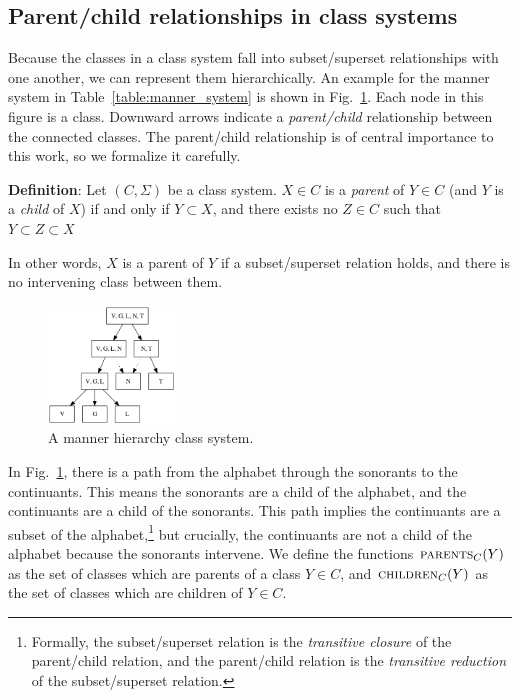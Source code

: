 \documentclass[12pt, oneside]{article}   	%
\begin{document}
\subsection{Parent/child relationships in class systems}

Because the classes in a class system fall into subset/superset relationships with one another, we can represent them hierarchically. An example for the manner system in Table~\ref{table:manner_system} is shown in Fig.~\ref{fig:manner_input}. Each node in this figure is a class. Downward arrows indicate a \textit{parent/child} relationship between the connected classes. The parent/child relationship is of central importance to this work, so we formalize it carefully.

\vspace{0.5\baselineskip} \noindent \textbf{Definition}: Let $(C, \Sigma)$ be a class system. $X \in C$ is a \textit{parent} of $Y \in C$ (and $Y$ is a \textit{child} of $X$) if and only if $Y \subset X$, and there exists no $Z \in C$ such that $Y \subset Z \subset X$

\vspace{0.5\baselineskip} \noindent In other words, $X$ is a parent of $Y$ if a subset/superset relation holds, and there is no intervening class between them.

\begin{figure}[htb!]
	\centering
	\includegraphics[width=0.3\textwidth]{manner_poset_privative.png}
	\caption{A manner hierarchy class system.}
	\label{fig:manner_input}
\end{figure}

In Fig.~\ref{fig:manner_input}, there is a path from the alphabet through the sonorants to the continuants. This means the sonorants are a child of the alphabet, and the continuants are a child of the sonorants. This path implies the continuants are a subset of the alphabet,\footnote{Formally, the subset/superset relation is the \textit{transitive closure} of the parent/child relation, and the parent/child relation is the \textit{transitive reduction} of the subset/superset relation.} but crucially, the continuants are not a child of the alphabet because the sonorants intervene. We  define the functions $\textsc{parents}_C(Y)$ as the set of classes which are parents of a class $Y \in C$, and $\textsc{children}_C(Y)$ as the set of classes which are children of $Y \in C$.
\end{document}
